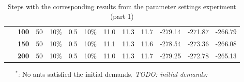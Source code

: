 \begin{sidewaystable}
\begin{tabular}{|l|l|l|l|l|l||c|c|c|c|c|c|}
    ~ & \textbf{100} & 50 & 10\% & 0.5 & 10\% & 11.0 & 11.3 & 11.7 & -279.14 & -271.87 & -266.79 \\
    ~ & \textbf{150} & 50 & 10\% & 0.5 & 10\% & 11.1 & 11.3 & 11.6 & -278.54 & -273.36 & -266.08 \\
    ~ & \textbf{200} & 50 & 10\% & 0.5 & 10\% & 11.0 & 11.3 & 11.7 & -279.25 & -272.78 & -265.13 \\
    \hline
    \end{tabular}
    \caption {Steps with the corresponding results from the parameter settings experiment (part 1)}
    \tiny
    \begin{itemize}[noitemsep]
    \item[$^*$:] No ants satisfied the initial demands, \emph{\color{blue} TODO: initial demands: }
    \end{itemize}
    \label{table:pm1}
\end{sidewaystable}




